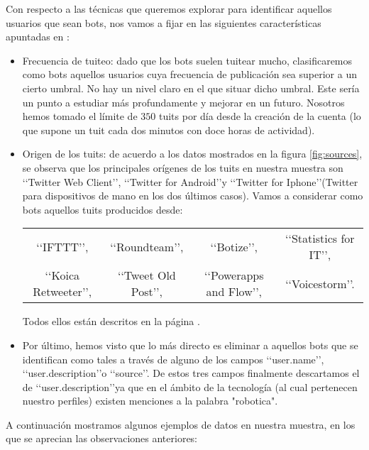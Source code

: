 Con respecto a las técnicas que queremos explorar para identificar aquellos usuarios
que sean bots, nos vamos a fijar en las siguientes características apuntadas en \cite{user_class6}:
\begin{itemize}
\item Frecuencia de tuiteo: dado que los bots suelen tuitear mucho, clasificaremos como
bots aquellos usuarios cuya frecuencia de publicación sea superior a un cierto umbral. No hay un 
nivel claro en el que situar dicho umbral. Este sería un punto a estudiar más profundamente y mejorar en un futuro. Nosotros hemos tomado el límite de $350$ tuits por día  desde la creación de la cuenta (lo que 
supone un tuit cada dos minutos con doce horas de actividad). 

\item Origen de los tuits: de acuerdo a los datos mostrados en la figura \ref{fig:sources}, se observa
que los principales orígenes de los tuits en nuestra muestra son \lq\lq Twitter Web Client\rq\rq, 
\lq\lq Twitter for Android\rq\rq y  \lq\lq Twitter for Iphone\rq\rq (Twitter para dispositivos de 
mano en los dos últimos casos). Vamos a considerar como bots aquellos tuits producidos desde: 

\begin{tabular}{cccc} 
\lq\lq IFTTT\rq\rq,  &\lq\lq Roundteam\rq\rq,  &\lq\lq Botize\rq\rq, &\lq\lq  Statistics for IT\rq\rq,\\
 \lq\lq  Koica Retweeter\rq\rq, &\lq\lq Tweet Old Post\rq\rq, &\lq\lq Powerapps and Flow\rq\rq, &\lq\lq Voicestorm\rq\rq. 
\end{tabular}

Todos ellos están descritos en la página \pageref{page:sources_descriptions}.

\item Por último, hemos visto que lo más directo es eliminar a aquellos bots que se identifican 
como tales a través de alguno de los campos \lq\lq user.name\rq\rq, \lq\lq user.description\rq\rq o \lq\lq source\rq\rq. De estos tres campos finalmente descartamos el de \lq\lq user.description\rq\rq ya que en el ámbito de la tecnología (al cual pertenecen nuestro perfiles) existen menciones a la palabra "robotica". 
\end{itemize}
A continuación mostramos algunos ejemplos de datos en nuestra muestra, en los que se aprecian
las observaciones anteriores:


